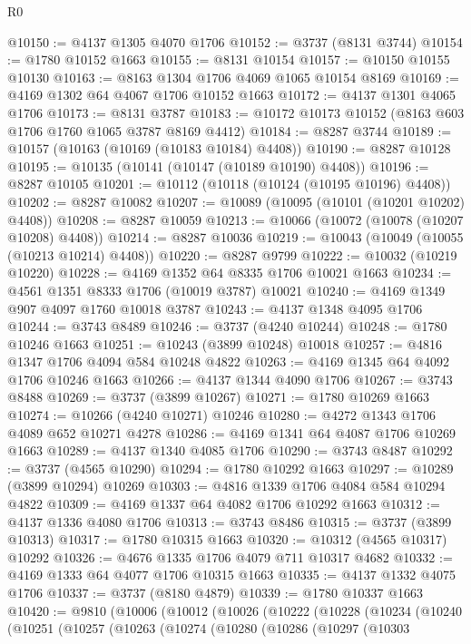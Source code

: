 \begin{lexlean}{R0}
\begin{coremodule}
@10150 := @4137 @1305 @4070 @1706
@10152 := @3737 (@8131 @3744)
@10154 := @1780 @10152 @1663
@10155 := @8131 @10154
@10157 := @10150 @10155 @10130
@10163 := @8163 @1304 @1706 @4069 @1065 @10154 @8169
@10169 := @4169 @1302 @64 @4067 @1706 @10152 @1663
@10172 := @4137 @1301 @4065 @1706
@10173 := @8131 @3787
@10183 := @10172 @10173 @10152 (@8163 @603 @1706 @1760 @1065 @3787 @8169 @4412)
@10184 := @8287 @3744
@10189 := @10157 (@10163 (@10169 (@10183 @10184) @4408))
@10190 := @8287 @10128
@10195 := @10135 (@10141 (@10147 (@10189 @10190) @4408))
@10196 := @8287 @10105
@10201 := @10112 (@10118 (@10124 (@10195 @10196) @4408))
@10202 := @8287 @10082
@10207 := @10089 (@10095 (@10101 (@10201 @10202) @4408))
@10208 := @8287 @10059
@10213 := @10066 (@10072 (@10078 (@10207 @10208) @4408))
@10214 := @8287 @10036
@10219 := @10043 (@10049 (@10055 (@10213 @10214) @4408))
@10220 := @8287 @9799
@10222 := @10032 (@10219 @10220)
@10228 := @4169 @1352 @64 @8335 @1706 @10021 @1663
@10234 := @4561 @1351 @8333 @1706 (@10019 @3787) @10021
@10240 := @4169 @1349 @907 @4097 @1760 @10018 @3787
@10243 := @4137 @1348 @4095 @1706
@10244 := @3743 @8489
@10246 := @3737 (@4240 @10244)
@10248 := @1780 @10246 @1663
@10251 := @10243 (@3899 @10248) @10018
@10257 := @4816 @1347 @1706 @4094 @584 @10248 @4822
@10263 := @4169 @1345 @64 @4092 @1706 @10246 @1663
@10266 := @4137 @1344 @4090 @1706
@10267 := @3743 @8488
@10269 := @3737 (@3899 @10267)
@10271 := @1780 @10269 @1663
@10274 := @10266 (@4240 @10271) @10246
@10280 := @4272 @1343 @1706 @4089 @652 @10271 @4278
@10286 := @4169 @1341 @64 @4087 @1706 @10269 @1663
@10289 := @4137 @1340 @4085 @1706
@10290 := @3743 @8487
@10292 := @3737 (@4565 @10290)
@10294 := @1780 @10292 @1663
@10297 := @10289 (@3899 @10294) @10269
@10303 := @4816 @1339 @1706 @4084 @584 @10294 @4822
@10309 := @4169 @1337 @64 @4082 @1706 @10292 @1663
@10312 := @4137 @1336 @4080 @1706
@10313 := @3743 @8486
@10315 := @3737 (@3899 @10313)
@10317 := @1780 @10315 @1663
@10320 := @10312 (@4565 @10317) @10292
@10326 := @4676 @1335 @1706 @4079 @711 @10317 @4682
@10332 := @4169 @1333 @64 @4077 @1706 @10315 @1663
@10335 := @4137 @1332 @4075 @1706
@10337 := @3737 (@8180 @4879)
@10339 := @1780 @10337 @1663
@10420 := @9810
    (@10006
      (@10012
        (@10026
          (@10222
            (@10228
              (@10234
                (@10240
                  (@10251
                    (@10257
                      (@10263
                        (@10274
                          (@10280
                            (@10286
                              (@10297
                                (@10303

\end{coremodule}
\end{lexlean}
